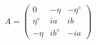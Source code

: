 \begin{equation}
A=\left(\begin{array}{ccc}
0&-\eta&-\eta^\diamond\\
\eta^{\diamond}&ia&ib\\
-\eta&ib^\diamond&-ia
\end{array}\right)
\end{equation}

